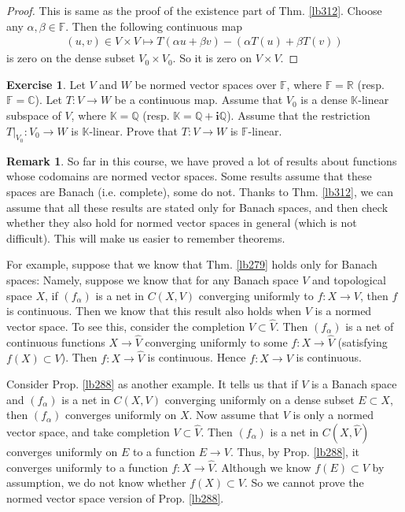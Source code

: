 \documentclass[12pt,b5paper,notitlepage]{article}
\theoremstyle{definition}
\newtheorem{exe}[df]{Exercise}
\newtheorem{rem}[df]{Remark}
\theoremstyle{plain}
\newcommand{\wht}{\widehat}
\newcommand{\im}{\mathbf{i}}
\newcommand{\Kbb}{\mathbb K}
\newcommand{\Cbb}{\mathbb C}
\newcommand{\Qbb}{\mathbb Q}
\newcommand{\Rbb}{\mathbb R}
\newcommand{\Fbb}{\mathbb F}
\numberwithin{equation}{section}
\begin{document}
\begin{proof}
This is same as the proof of the existence part of Thm. \ref{lb312}. Choose any $\alpha,\beta\in\Fbb$. Then the following continuous map
\begin{gather*}
(u,v)\in V\times V\mapsto T(\alpha u+\beta v)-(\alpha T(u)+\beta T(v))
\end{gather*}
is zero on the dense subset $V_0\times V_0$. So it is zero on $V\times V$.
\end{proof}


\begin{exe}
Let $V$ and $W$ be normed vector spaces over $\Fbb$, where $\Fbb=\Rbb$ (resp. $\Fbb=\Cbb$). Let $T:V\rightarrow W$ be a continuous map. Assume that $V_0$ is a dense $\Kbb$-linear subspace of $V$, where $\Kbb=\Qbb$ (resp. $\Kbb=\Qbb+\im\Qbb$). Assume that the restriction $T|_{V_0}:V_0\rightarrow W$ is $\Kbb$-linear. Prove that $T:V\rightarrow W$ is $\Fbb$-linear.
\end{exe}


\begin{rem}
So far in this course, we have proved a lot of results about functions whose codomains are normed vector spaces. Some results assume that these spaces are Banach (i.e. complete), some do not. Thanks to Thm. \ref{lb312}, we can assume that all these results are stated only for Banach spaces, and then check whether they also hold for normed vector spaces in general (which is not difficult). This will make us easier to remember theorems.

For example, suppose that we know that Thm. \ref{lb279} holds only for Banach spaces: Namely, suppose we know that for any Banach space $V$ and topological space $X$, if $(f_\alpha)$ is a net in $C(X,V)$ converging uniformly to $f:X\rightarrow V$, then $f$ is continuous. Then we know that this result also holds when $V$ is a normed vector space. To see this, consider the completion $V\subset\wht V$. Then $(f_\alpha)$ is a net of continuous functions $X\rightarrow\wht V$ converging uniformly to some $f:X\rightarrow \wht V$ (satisfying $f(X)\subset V$). Then $f:X\rightarrow\wht V$ is continuous. Hence $f:X\rightarrow V$ is continuous.

Consider Prop. \ref{lb288} as another example. It tells us that if $V$ is a Banach space and $(f_\alpha)$ is a net in $C(X,V)$ converging uniformly on a dense subset $E\subset X$, then $(f_\alpha)$ converges uniformly on $X$. Now assume that $V$ is only a normed vector space, and take completion $V\subset\wht V$. Then $(f_\alpha)$ is a net in $C(X,\wht V)$ converges uniformly on $E$ to a function $E\rightarrow V$. Thus, by Prop. \ref{lb288}, it converges uniformly to a function $f:X\rightarrow\wht V$. Although we know $f(E)\subset V$ by assumption, we do not know whether $f(X)\subset V$. So we cannot prove the normed vector space version of Prop. \ref{lb288}.  \hfill\qedsymbol 
\end{rem}
\end{document}
